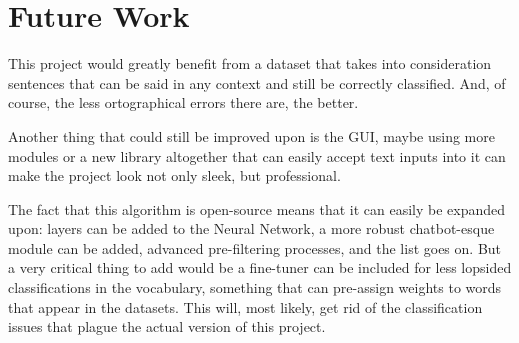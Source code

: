 \section{Future Work}
This project would greatly benefit from a dataset that takes into consideration sentences that can be said in any context and still be correctly classified. And, of course, the less ortographical errors there are, the better.

Another thing that could still be improved upon is the GUI, maybe using more modules or a new library altogether that can easily accept text inputs into it can make the project look not only sleek, but professional.

The fact that this algorithm is open-source means that it can easily be expanded upon: layers can be added to the Neural Network, a more robust chatbot-esque module can be added, advanced pre-filtering processes, and the list goes on. But a very critical thing to add would be a fine-tuner can be included for less lopsided classifications in the vocabulary, something that can pre-assign weights to words that appear in the datasets. This will, most likely, get rid of the classification issues that plague the actual version of this project.